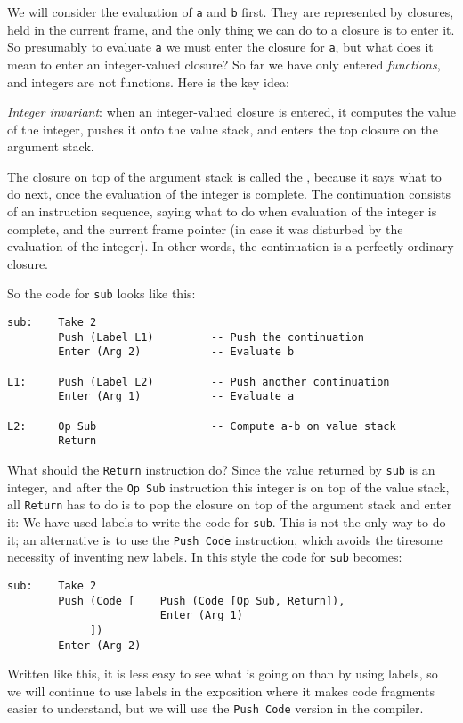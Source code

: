 We will consider the evaluation of \mbox{\tt a} and \mbox{\tt b} first.  They are represented by
closures, held in the current frame, and the
only thing we can do to a closure is
to enter it.  So presumably to evaluate \mbox{\tt a} we must enter the closure for \mbox{\tt a},
but what does it mean to enter an integer-valued closure?  So far we have
only entered {\em functions}, and integers are not functions.
Here is the key idea:
\begin{important}
{\em Integer invariant\/}:
when an integer-valued closure is entered, it computes the value of the
integer, pushes it onto the value stack, and enters the top closure on the
argument stack.
\end{important}
The closure on top of the argument stack is called the ,
because it says what to do next, once the evaluation of the integer is
complete.
The continuation consists of an instruction sequence, saying what to
do when evaluation of the integer is complete,
and the current frame pointer (in case it was disturbed by
the evaluation of the integer).
In other words, the continuation is a perfectly
ordinary closure.

So the code for \mbox{\tt sub} looks like this:
\begin{verbatim}
sub:    Take 2
        Push (Label L1)         -- Push the continuation
        Enter (Arg 2)           -- Evaluate b

L1:     Push (Label L2)         -- Push another continuation
        Enter (Arg 1)           -- Evaluate a

L2:     Op Sub                  -- Compute a-b on value stack
        Return
\end{verbatim}
What should the \mbox{\tt Return} instruction do?
Since the
value returned by \mbox{\tt sub} is an integer, and after the \mbox{\tt Op\ Sub} instruction this
integer is on top of the value stack, all \mbox{\tt Return} has to do is to pop
the closure on top of the argument stack and enter it:
\timruleV
{}
{}
\label{rule:tim-return}
We have used labels to write the code
for \mbox{\tt sub}.  This is not the only way to do it; an alternative is
to use the \mbox{\tt Push\ Code} instruction, which avoids the tiresome
necessity of inventing new labels.  In this style the code for \mbox{\tt sub} becomes:
\begin{verbatim}
sub:    Take 2
        Push (Code [    Push (Code [Op Sub, Return]),
                        Enter (Arg 1)
             ])
        Enter (Arg 2)
\end{verbatim}
Written like this, it is less easy to see what is going on
than by using labels, so we will continue to use labels in the exposition
where it makes code fragments easier to understand, but we will use the
\mbox{\tt Push\ Code} version in the compiler.

